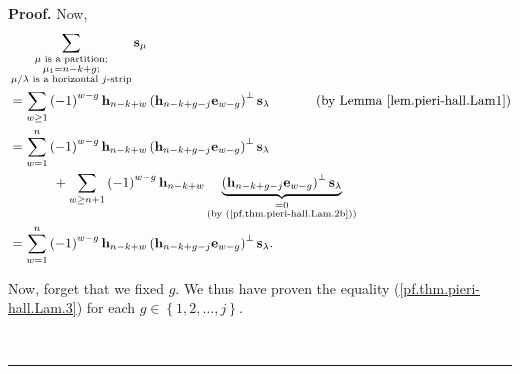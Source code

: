 \documentclass[numbers=enddot,12pt,final,onecolumn,notitlepage]{scrartcl}%
\theoremstyle{definition}
\newenvironment{proof}[1][Proof]{\noindent\textbf{#1.} }{\ \rule{0.5em}{0.5em}}
\let\sumnonlimits\sum
\renewcommand{\sum}{\sumnonlimits\limits}
\begin{document}
\begin{proof}
Now,%
\begin{align}
&  \sum_{\substack{\mu\text{ is a partition;}\\\mu_{1}=n-k+g;\\\mu
/\lambda\text{ is a horizontal }j\text{-strip}}}\mathbf{s}_{\mu}\nonumber\\
&  =\sum_{w\geq1}\left(  -1\right)  ^{w-g}\mathbf{h}_{n-k+w}\left(
\mathbf{h}_{n-k+g-j}\mathbf{e}_{w-g}\right)  ^{\perp}\mathbf{s}_{\lambda
}\ \ \ \ \ \ \ \ \ \ \left(  \text{by Lemma \ref{lem.pieri-hall.Lam1}}\right)
\nonumber\\
&  =\sum_{w=1}^{n}\left(  -1\right)  ^{w-g}\mathbf{h}_{n-k+w}\left(
\mathbf{h}_{n-k+g-j}\mathbf{e}_{w-g}\right)  ^{\perp}\mathbf{s}_{\lambda
}\nonumber\\
&  \ \ \ \ \ \ \ \ \ \ +\sum_{w\geq n+1}\left(  -1\right)  ^{w-g}%
\mathbf{h}_{n-k+w}\underbrace{\left(  \mathbf{h}_{n-k+g-j}\mathbf{e}%
_{w-g}\right)  ^{\perp}\mathbf{s}_{\lambda}}_{\substack{=0\\\text{(by
(\ref{pf.thm.pieri-hall.Lam.2b}))}}}\nonumber\\
&  =\sum_{w=1}^{n}\left(  -1\right)  ^{w-g}\mathbf{h}_{n-k+w}\left(
\mathbf{h}_{n-k+g-j}\mathbf{e}_{w-g}\right)  ^{\perp}\mathbf{s}_{\lambda}.
\label{pf.thm.pieri-hall.Lam.3}%
\end{align}


Now, forget that we fixed $g$. We thus have proven the equality
(\ref{pf.thm.pieri-hall.Lam.3}) for each $g\in\left\{  1,2,\ldots,j\right\}  $.


\end{proof}
\end{document}
